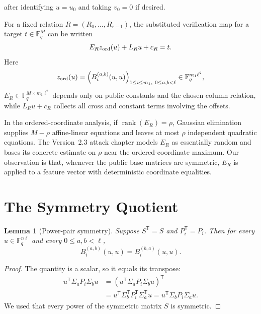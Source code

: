 \documentclass[11pt]{article}
\newtheorem{lemma}[theorem]{Lemma}
\newcommand{\F}{\mathbb F}
\newcommand{\rank}{\operatorname{rank}}
\newcommand{\transpose}{\mathsf T}
\begin{document}
after identifying $u=u_0$ and taking $v_0=0$ if desired.

For a fixed relation $R=(R_0,\ldots,R_{r-1})$, the substituted verification map for a target $t\in\F_q^M$ can be written
\begin{equation}\label{eq:affine-system}
 E_R z_{\rm ord}(u)+L_Ru+c_R=t.
\end{equation}
Here
\[
 z_{\rm ord}(u)
 =\left(B_i^{(a,b)}(u,u)\right)_{1\le i\le m_1,\ 0\le a,b<\ell}
 \in\F_q^{m_1\ell^2},
\]
$E_R\in\F_q^{M\times m_1\ell^2}$ depends only on public constants and the chosen column relation, while $L_Ru+c_R$ collects all cross and constant terms involving the offsets.

In the ordered-coordinate analysis, if $\rank(E_R)=\rho$, Gaussian elimination supplies $M-\rho$ affine-linear equations and leaves at most $\rho$ independent quadratic equations.  The Version~2.3 attack chapter models $E_R$ as essentially random and bases its concrete estimate on $\rho$ near the ordered-coordinate maximum.  Our observation is that, whenever the public base matrices are symmetric, $E_R$ is applied to a feature vector with deterministic coordinate equalities.

\section{The Symmetry Quotient}\label{sec:symmetry}

\begin{lemma}[Power-pair symmetry]\label{lem:powerpair}
Suppose $S^\transpose=S$ and $P_i^\transpose=P_i$.  Then for every $u\in\F_q^{n\ell}$ and every $0\le a,b<\ell$,
\[
 B_i^{(a,b)}(u,u)=B_i^{(b,a)}(u,u).
\]
\end{lemma}

\begin{proof}
The quantity is a scalar, so it equals its transpose:
\[
 \begin{aligned}
 u^\transpose\Sigma_aP_i\Sigma_bu
 &=\left(u^\transpose\Sigma_aP_i\Sigma_bu\right)^\transpose\\
 &=u^\transpose\Sigma_b^\transpose P_i^\transpose\Sigma_a^\transpose u
 =u^\transpose\Sigma_bP_i\Sigma_au.
 \end{aligned}
\]
We used that every power of the symmetric matrix $S$ is symmetric.
\end{proof}
\end{document}

